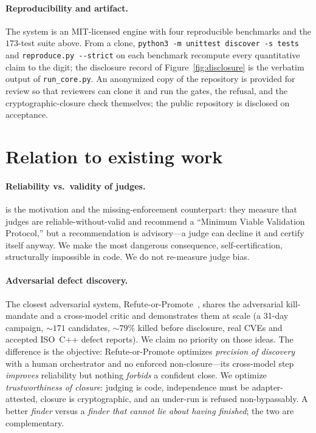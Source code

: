 \documentclass{article}
\begin{document}
\paragraph{Reproducibility and artifact.} The system is an MIT-licensed engine with four reproducible
benchmarks and the $173$-test suite above. From a clone, \texttt{python3 -m unittest discover -s tests}
and \texttt{reproduce.py -{}-strict} on each benchmark recompute every quantitative claim to the digit;
the disclosure record of Figure~\ref{fig:disclosure} is the verbatim output of \texttt{run\_core.py}. An
anonymized copy of the repository is provided for review so that reviewers can clone it and run the
gates, the refusal, and the cryptographic-closure check themselves; the public repository is disclosed on
acceptance.

\section{Relation to existing work}
\paragraph{Reliability vs.\ validity of judges.} \cite{norman2026reliability} is the motivation and the
missing-enforcement counterpart: they measure that judges are reliable-without-valid and recommend a
``Minimum Viable Validation Protocol,'' but a recommendation is advisory---a judge can decline it and
certify itself anyway. We make the most dangerous consequence, self-certification, structurally
impossible in code. We do not re-measure judge bias.

\paragraph{Adversarial defect discovery.} The closest adversarial system,
Refute-or-Promote~\cite{agarwal2026refute}, shares the adversarial kill-mandate and a cross-model critic
and demonstrates them at scale (a 31-day campaign, ${\sim}171$ candidates, ${\sim}79\%$ killed before
disclosure, real CVEs and accepted ISO~C++ defect reports). We claim no priority on those ideas. The
difference is the objective: Refute-or-Promote optimizes \emph{precision of discovery} with a human
orchestrator and no enforced non-closure---its cross-model step \emph{improves} reliability but nothing
\emph{forbids} a confident close. We optimize \emph{trustworthiness of closure}: judging is code,
independence must be adapter-attested, closure is cryptographic, and an under-run is refused
non-bypassably. A better \emph{finder} versus a \emph{finder that cannot lie about having finished}; the
two are complementary.
\end{document}
